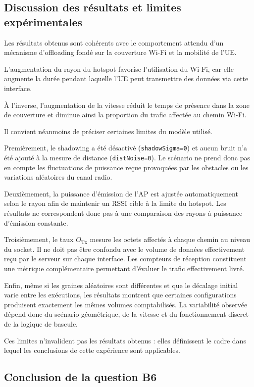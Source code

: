 \subsection{Discussion des résultats et limites expérimentales}

Les résultats obtenus sont cohérents avec le comportement
attendu d'un mécanisme d'offloading fondé sur la couverture
Wi-Fi et la mobilité de l'UE.

L'augmentation du rayon du hotspot favorise l'utilisation
du Wi-Fi, car elle augmente la durée pendant laquelle l'UE
peut transmettre des données via cette interface.

À l'inverse, l'augmentation de la vitesse réduit le temps
de présence dans la zone de couverture et diminue ainsi
la proportion du trafic affectée au chemin Wi-Fi.

Il convient néanmoins de préciser certaines limites du
modèle utilisé.

Premièrement, le shadowing a été désactivé
(\texttt{shadowSigma=0}) et aucun bruit n'a été ajouté
à la mesure de distance (\texttt{distNoise=0}).
Le scénario ne prend donc pas en compte les fluctuations
de puissance reçue provoquées par les obstacles ou les
variations aléatoires du canal radio.

Deuxièmement, la puissance d'émission de l'AP est ajustée
automatiquement selon le rayon afin de maintenir un RSSI
cible à la limite du hotspot. Les résultats ne correspondent
donc pas à une comparaison des rayons à puissance d'émission
constante.

Troisièmement, le taux $O_{\mathrm{Tx}}$ mesure les octets
affectés à chaque chemin au niveau du socket. Il ne doit
pas être confondu avec le volume de données effectivement
reçu par le serveur sur chaque interface. Les compteurs
de réception constituent une métrique complémentaire
permettant d'évaluer le trafic effectivement livré.

Enfin, même si les graines aléatoires sont différentes
et que le décalage initial varie entre les exécutions,
les résultats montrent que certaines configurations
produisent exactement les mêmes volumes comptabilisés.
La variabilité observée dépend donc du scénario géométrique,
de la vitesse et du fonctionnement discret de la logique
de bascule.

Ces limites n'invalident pas les résultats obtenus :
elles définissent le cadre dans lequel les conclusions
de cette expérience sont applicables.

\subsection{Conclusion de la question B6}

